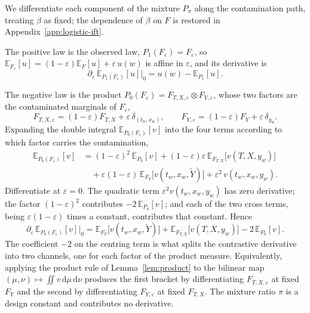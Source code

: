 \documentclass[11pt]{article}
\theoremstyle{plain}
\theoremstyle{definition}
\theoremstyle{remark}
\newcommand{\pE}{\ensuremath{\mathbb{E}}}
\newcommand{\ratio}{\ensuremath{\pi}}
\newcommand{\dd}{\,\mathrm{d}}
\begin{document}
We differentiate each component of the mixture $P_\ratio$ along the contamination path,
treating $\beta$ as fixed; the dependence of $\beta$ on $F$ is restored in
Appendix~\ref{app:logistic-ift}.

The positive law is the observed law, $P_1(F_\varepsilon) = F_\varepsilon$, so
$\pE_{F_\varepsilon}[u] = (1-\varepsilon)\pE_F[u] + \varepsilon\,u(w)$ is affine in
$\varepsilon$, and its derivative is
\begin{equation}
\partial_\varepsilon\, \pE_{P_1(F_\varepsilon)}[u]\big|_{0}
= u(w) - \pE_{P_1}[u].
\label{eq:app-channel1}
\end{equation}

The negative law is the product $P_0(F_\varepsilon) = F_{T,X,\varepsilon} \otimes F_{Y,\varepsilon}$,
whose two factors are the contaminated marginals of $F_\varepsilon$,
\[
F_{T,X,\varepsilon} = (1-\varepsilon)F_{T,X} + \varepsilon\,\delta_{(t_w,x_w)},
\qquad
F_{Y,\varepsilon} = (1-\varepsilon)F_Y + \varepsilon\,\delta_{y_w} .
\]
Expanding the double integral $\pE_{P_0(F_\varepsilon)}[v]$ into the four terms according to
which factor carries the contamination,
\begin{equation}
\begin{aligned}
\pE_{P_0(F_\varepsilon)}[v]
&= (1-\varepsilon)^2\,\pE_{P_0}[v]
+ (1-\varepsilon)\varepsilon\,\pE_{F_{T,X}}\big[ v(T,X,y_w) \big] \\
&\quad + \varepsilon(1-\varepsilon)\,\pE_{F_Y}\big[ v(t_w,x_w,\widetilde Y) \big]
+ \varepsilon^2\, v(t_w,x_w,y_w).
\end{aligned}
\label{eq:app-p0-expanded}
\end{equation}
Differentiate at $\varepsilon = 0$. The quadratic term $\varepsilon^2 v(t_w,x_w,y_w)$ has zero
derivative; the factor $(1-\varepsilon)^2$ contributes $-2\,\pE_{P_0}[v]$; and each of the two
cross terms, being $\varepsilon(1-\varepsilon)$ times a constant, contributes that constant.
Hence
\begin{equation}
\partial_\varepsilon\, \pE_{P_0(F_\varepsilon)}[v]\big|_{0}
= \pE_{F_Y}\big[ v(t_w,x_w,\widetilde Y) \big]
+ \pE_{F_{T,X}}\big[ v(T,X,y_w) \big]
- 2\,\pE_{P_0}[v].
\label{eq:app-channel0}
\end{equation}
The coefficient $-2$ on the centring term is what splits the contrastive derivative into two
channels, one for each factor of the product measure. Equivalently, applying the product rule
of Lemma~\ref{lem:product} to the bilinear map
$(\mu,\nu) \mapsto \iint v \dd\mu \dd\nu$ produces the first bracket by differentiating
$F_{T,X,\varepsilon}$ at fixed $F_Y$ and the second by differentiating $F_{Y,\varepsilon}$ at
fixed $F_{T,X}$. The mixture ratio $\ratio$ is a design constant and contributes no derivative.
\end{document}
